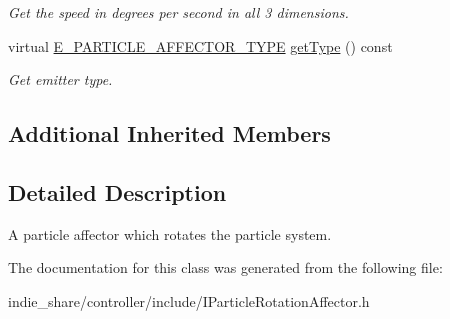 \begin{DoxyCompactItemize}
\begin{DoxyCompactList}\small\item\em Get the speed in degrees per second in all 3 dimensions. \end{DoxyCompactList}\item 
\mbox{\label{classirr_1_1scene_1_1IParticleRotationAffector_a01055bd7d4720418bc2a3b16fce58571}} 
virtual \hyperlink{namespaceirr_1_1scene_a34c0f9475cfcbda8b50ad816a046010b}{E\+\_\+\+P\+A\+R\+T\+I\+C\+L\+E\+\_\+\+A\+F\+F\+E\+C\+T\+O\+R\+\_\+\+T\+Y\+PE} \hyperlink{classirr_1_1scene_1_1IParticleRotationAffector_a01055bd7d4720418bc2a3b16fce58571}{get\+Type} () const
\begin{DoxyCompactList}\small\item\em Get emitter type. \end{DoxyCompactList}\end{DoxyCompactItemize}
\subsection*{Additional Inherited Members}


\subsection{Detailed Description}
A particle affector which rotates the particle system. 

The documentation for this class was generated from the following file\+:\begin{DoxyCompactItemize}
\item 
indie\+\_\+share/controller/include/I\+Particle\+Rotation\+Affector.\+h\end{DoxyCompactItemize}
